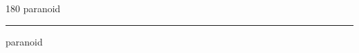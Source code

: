 
\begin{frame}
\begin{center}
\begin{turn}{180}
{\fontsize{2.5cm}{1em}\selectfont paranoid}
\end{turn}
\vspace{1em}\par  
\hrule
\vspace{1em}\par  
{\fontsize{2.5cm}{1em}\selectfont paranoid}
\end{center}
\end{frame}
